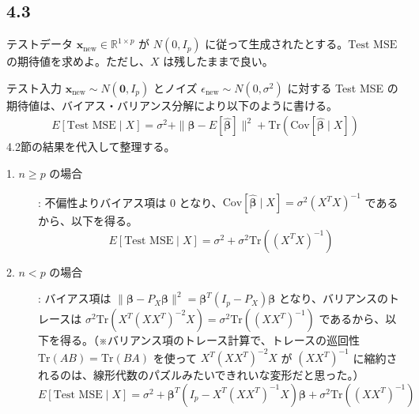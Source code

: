 \documentclass[11pt,a4paper,dvipdfmx]{article}
\numberwithin{equation}{section}
\newenvironment{note}[0]
{
    \begin{tcolorbox}[sharp corners, colframe=gray!20, colback=gray!20, width=\textwidth]
}
{
    \end{tcolorbox}
}
\begin{document}
\subsection*{4.3}
\begin{note}
テストデータ $\bm{x}_{\text{new}} \in \mathbb{R}^{1 \times p}$ が $N(0, I_p)$ に従って生成されたとする。$\text{Test MSE}$ の期待値を求めよ。ただし、$X$ は残したままで良い。
\end{note}
\begin{proofbox}
テスト入力 $\bm{x}_{\text{new}} \sim N(\bm{0}, I_p)$ とノイズ $\epsilon_{\text{new}} \sim N(0, \sigma^2)$ に対する Test MSE の期待値は、バイアス・バリアンス分解により以下のように書ける。
\begin{align}
E[\text{Test MSE} \mid X] = \sigma^2 + \|\bm{\beta} - E[\hat{\bm{\beta}}]\|^2 + \text{Tr}\left(\text{Cov}[\hat{\bm{\beta}} \mid X]\right)
\end{align}
4.2節の結果を代入して整理する。
\begin{description}
    \item[1. $n \ge p$ の場合]:
    不偏性よりバイアス項は 0 となり、$\text{Cov}[\hat{\bm{\beta}} \mid X] = \sigma^2 (X^T X)^{-1}$ であるから、以下を得る。
    \begin{equation}
    E[\text{Test MSE} \mid X] = \sigma^2 + \sigma^2 \text{Tr}\left( (X^T X)^{-1} \right)
    \end{equation}
    
    \item[2. $n < p$ の場合]:
    バイアス項は $\|\bm{\beta} - P_X \bm{\beta}\|^2 = \bm{\beta}^T (I_p - P_X) \bm{\beta}$ となり、バリアンスのトレースは $\sigma^2 \text{Tr}(X^T(XX^T)^{-2}X) = \sigma^2 \text{Tr}((XX^T)^{-1})$ であるから、以下を得る。（※バリアンス項のトレース計算で、トレースの巡回性 $\text{Tr}(AB)=\text{Tr}(BA)$ を使って $X^T (X X^T)^{-2} X$ が $(X X^T)^{-1}$ に縮約されるのは、線形代数のパズルみたいできれいな変形だと思った。）
    \begin{equation}
    E[\text{Test MSE} \mid X] = \sigma^2 + \bm{\beta}^T \left( I_p - X^T (X X^T)^{-1} X \right) \bm{\beta} + \sigma^2 \text{Tr}\left( (X X^T)^{-1} \right)
    \end{equation}
\end{description}
\end{proofbox}
\end{document}
